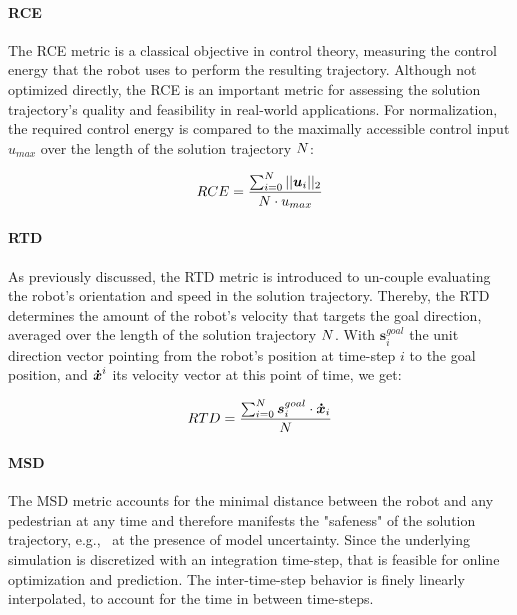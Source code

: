 \paragraph{\ac{RCE}}
The \ac{RCE} metric is a classical objective in control theory, measuring the control energy that the robot uses to perform the resulting trajectory. Although not optimized directly, the \ac{RCE} is an important metric for assessing the solution trajectory's quality and feasibility in real-world applications. For normalization, the required control energy is compared to the maximally accessible control input $u_{max}$ over the length of the solution trajectory $N$:

\begin{equation}
RCE = \frac{\sum_{i = 0}^{N} ||\boldsymbol{u}_i||_2}{N \cdot u_{max}}
\end{equation}

\paragraph{\ac{RTD}}
As previously discussed, the \ac{RTD} metric is introduced to un-couple evaluating the robot's orientation and speed in the solution trajectory. Thereby, the \ac{RTD} determines the amount of the robot's velocity that targets the goal direction, averaged over the length of the solution trajectory $N$. With $\boldsymbol{s}_i^{goal}$ the unit direction vector pointing from the robot's position at time-step $i$ to the goal position, and $\boldsymbol{\dot{x}}^i$ its velocity vector at this point of time, we get:

\begin{equation}
RTD = \frac{\sum_{i=0}^{N} \boldsymbol{s}_i^{goal} \cdot \boldsymbol{\dot{x}}_i}{N}
\end{equation}

\paragraph{\ac{MSD}}
The \ac{MSD} metric accounts for the minimal distance between the robot and any pedestrian at any time and therefore manifests the "safeness" of the solution trajectory, e.g., \ at the presence of model uncertainty. Since the underlying simulation is discretized with an integration time-step, that is feasible for online optimization and prediction. The inter-time-step behavior is finely linearly interpolated, to account for the time in between time-steps.

